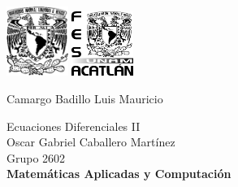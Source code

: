 \begin{titlepage}
    \begin{center}
        \includegraphics[width=0.15\textwidth]{../auxiliary/assets/unam.png}
        \hspace{0.6\textwidth}
        \includegraphics[width=0.15\textwidth]{../auxiliary/assets/fes.png}

        \vspace*{5cm}
        \LARGE
        \textbf{\titulo}

        \vspace{1cm}
        \large
        Camargo Badillo Luis Mauricio \\
        \vspace{1.5cm}
        \textit{\fecha}

        \vfill

        \vspace{0.5cm}
        Ecuaciones Diferenciales II \\
        Oscar Gabriel Caballero Martínez \\
        Grupo 2602 \\
        \textbf{Matemáticas Aplicadas y Computación}\\
    \end{center}
\end{titlepage}
